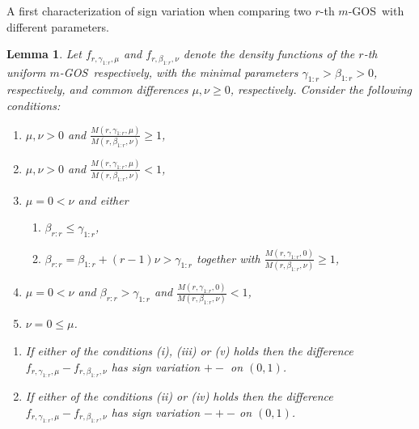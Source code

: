 \documentclass [11pt]{article}
\newtheorem{lemma}{Lemma}
\newcommand{\gos}{GOS}
\begin{document}
A first characterization of sign variation when comparing two $r$-th $m$-\gos\ with different parameters.
{\samepage
\begin{lemma}\label{t1}
Let $f_{r,\gamma_{1:r},\mu}$ and $f_{r,\beta_{1:r},\nu}$ denote the density functions of the $r$-th uniform $m$-\gos\, respectively, with the minimal parameters $\gamma_{1:r} > \beta_{1:r}>0$, respectively, and common differences $\mu, \nu \geq 0$, respectively. Consider the following conditions:
    \begin{enumerate}%
    \item\label{cc1}
    $\mu, \nu >0$ and $\frac{M(r,\gamma_{1:r},\mu)}{M(r,\beta_{1:r},\nu)}\geq 1$, 
    
    \item\label{cc2}
    $\mu, \nu >0$ and $\frac{M(r,\gamma_{1:r},\mu)}{M(r,\beta_{1:r},\nu)} < 1$, 
    
    \item\label{cc3}
    $\mu=0 <\nu$ and either 
        \begin{enumerate}
        \item
        $\beta_{r:r}\leq\gamma_{1:r}$,
        \item
        $\beta_{r:r}= \beta_{1:r} + (r-1)\nu > \gamma_{1:r}$ together with $\frac{M(r,\gamma_{1:r},0)}{M(r,\beta_{1:r},\nu)}\geq 1$,
        \end{enumerate}
    
    \item\label{cc4}
    $\mu=0 <\nu$ and $\beta_{r:r}>\gamma_{1:r}$ and  $\frac{M(r,\gamma_{1:r},0)}{M(r,\beta_{1:r},\nu)} < 1$,
                    
    \item\label{cc5}
    $\nu=0\leq\mu$.
    \end{enumerate}
    \begin{enumerate}
    \item[1.]
    If either of the conditions (i), (iii) or (v) %
    holds then the difference $f_{r,\gamma_{1:r},\mu}-f_{r,\beta_{1:r},\nu}$ has sign variation $+-$ on $(0,1)$.
    \item[2.]
    If either of the conditions (ii) or (iv) %
    holds then the difference $f_{r,\gamma_{1:r},\mu}-f_{r,\beta_{1:r},\nu}$ has sign variation $-+-$ on $(0,1)$.
    \end{enumerate}
\end{lemma}
}
\end{document}
